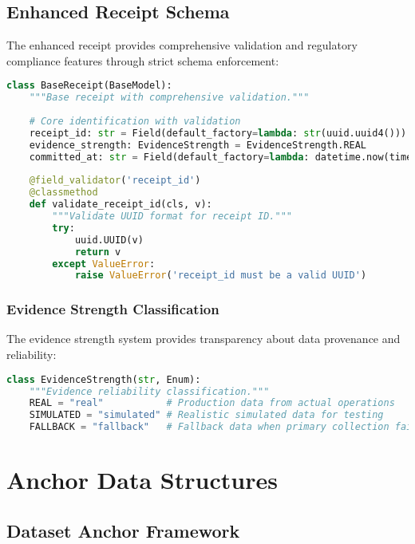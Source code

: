 \documentclass[12pt,a4paper]{article}
\begin{document}
\subsection{Enhanced Receipt Schema}

The enhanced receipt provides comprehensive validation and regulatory compliance features through strict schema enforcement:

\begin{lstlisting}[language=Python, caption=Enhanced Receipt Base Structure]
class BaseReceipt(BaseModel):
    """Base receipt with comprehensive validation."""
    
    # Core identification with validation
    receipt_id: str = Field(default_factory=lambda: str(uuid.uuid4()))
    evidence_strength: EvidenceStrength = EvidenceStrength.REAL
    committed_at: str = Field(default_factory=lambda: datetime.now(timezone.utc).isoformat().replace('+00:00', 'Z'))
    
    @field_validator('receipt_id')
    @classmethod
    def validate_receipt_id(cls, v):
        """Validate UUID format for receipt ID."""
        try:
            uuid.UUID(v)
            return v
        except ValueError:
            raise ValueError('receipt_id must be a valid UUID')
\end{lstlisting}

\subsubsection{Evidence Strength Classification}

The evidence strength system provides transparency about data provenance and reliability:

\begin{lstlisting}[language=Python, caption=Evidence Strength Enumeration]
class EvidenceStrength(str, Enum):
    """Evidence reliability classification."""
    REAL = "real"           # Production data from actual operations
    SIMULATED = "simulated" # Realistic simulated data for testing
    FALLBACK = "fallback"   # Fallback data when primary collection fails
\end{lstlisting}

\section{Anchor Data Structures}

\subsection{Dataset Anchor Framework}
\end{document}
